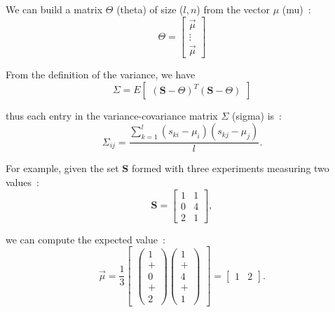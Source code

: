 \documentclass[11pt,twocolumn]{amsart} %
\begin{document}
We can build a matrix $\Theta$ (theta) of size ($l,n$) from the vector $\mu$ (mu)~:
\begin{equation*}
  \Theta = \begin{bmatrix} \vec{\mu} \\ \vdots \\ \vec{\mu} \end{bmatrix}
\end{equation*}

From the definition of the variance, we have
\begin{equation*}
  \Sigma = E \begin{bmatrix} (\textbf{S} - \Theta)^T (\textbf{S} - \Theta)\end{bmatrix}
\end{equation*}

thus each entry in the variance-covariance matrix $\Sigma$ (sigma) is~:
\begin{equation*}
  \Sigma_{ij} = \frac{\sum_{k=1}^{l} (s_{ki} - \mu_i)(s_{kj} - \mu_j)}{l}.
\end{equation*}


For example, given the set $\textbf{S}$ formed with three experiments measuring two values~:
\begin{displaymath}
  \textbf{S} = \begin{bmatrix} 1 & 1 \\ 0 & 4 \\ 2 & 1 \end{bmatrix},
\end{displaymath}

we can compute the expected value~:
\begin{equation*}
  \vec{\mu} = \frac{1}{3} \begin{bmatrix} \left( \begin{array}{c} 1 \\ + \\ 0 \\ + \\ 2 \end{array} \right) \left( \begin{array}{c} 1 \\ + \\ 4 \\ + \\ 1 \end{array} \right) \end{bmatrix} = \begin{bmatrix} 1 & 2 \end{bmatrix}.
\end{equation*}
\end{document}
